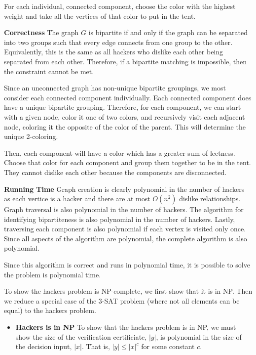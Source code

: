 \documentclass[12pt,twoside]{article}
\begin{document}
\begin{problems}
\begin{problemparts}
For each individual, connected component, choose the color with the highest
weight and take all the vertices of that color to put in the tent.

{\bf Correctness} The graph $G$ is bipartite if and only if the graph can be
separated into two groups such that every edge connects from one group to the
other. Equivalently, this is the same as all hackers who dislike each other
being separated from each other. Therefore, if a bipartite matching is
impossible, then the constraint cannot be met.

Since an unconnected graph has non-unique bipartite groupings, we most
consider each connected component individually. Each connected component does
have a unique bipartite grouping. Therefore, for each component, we can start
with a given node, color it one of two colors, and recursively visit each
adjacent node, coloring it the opposite of the color of the parent. This will
determine the unique 2-coloring.

Then, each component will have a color which has a greater sum of leetness.
Choose that color for each component and group them together to be in the
tent. They cannot dislike each other because the components are disconnected.

{\bf Running Time} Graph creation is clearly polynomial in the number of
hackers as each vertice is a hacker and there are at most $O(n^2)$ dislike
relationships. Graph traversal is also polynomial in the number of hackers.
The algorithm for identifying bipartiteness is also polynomial in the number
of hackers. Lastly, traversing each component is also polynomial if each
vertex is visited only once. Since all aspects of the algorithm are
polynomial, the complete algorithm is also polynomial.

Since this algorithm is correct and runs in polynomial time, it is possible
to solve the problem is polynomial time.

\problempart  %

To show the hackers problem is NP-complete, we first show that it is in NP.
Then we reduce a special case of the 3-SAT problem (where not all elements
can be equal) to the hackers problem.

\begin{itemize}

  \item {\bf Hackers is in NP} To show that the hackers problem is in NP, we
  must show the size of the verification certificiate, $|y|$, is polynomial
  in the size of the decision input, $|x|$. That is, $|y| \leq |x|^c$ for
  some constant $c$.


\end{itemize}
\end{problemparts}
\end{problems}
\end{document}
